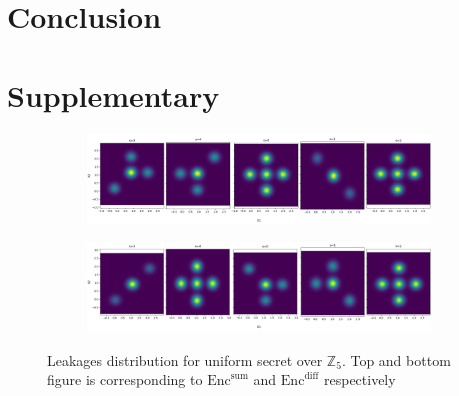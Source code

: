 \documentclass{llncs}
\begin{document}
	\section{Conclusion}
	\appendix
	\section{Supplementary}
	\begin{figure}
		\centering
		\begin{subfigure}{1\linewidth}
			\centering
			\includegraphics[scale=0.2]{figures/5_dist_sum.png}
		\end{subfigure} %
		
		\hfill
		
		\begin{subfigure}{1\linewidth}
			\includegraphics[scale=0.2]{figures/5_dist_diff.png}
		\end{subfigure}
		\caption{Leakages distribution for uniform secret over $\mathbb{Z}_5$. Top and bottom figure is corresponding to  $\text{Enc}^{\text{sum}}$ and  $\text{Enc}^{\text{diff}}$ respectively}
		\label{fig:dist5}
	\end{figure}
	
\end{document}
